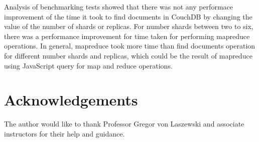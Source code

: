 Analysis of benchmarking tests showed that there was not any performace
improvement of the time it took to find documents in CouchDB  by
changing the value of the number of shards or replicas. For number
shards between two to six, there was a performance improvement for
time taken for performing mapreduce operations. In general, mapreduce
took more time than find documents operation for different number
shards and replicas, which could be the result of mapreduce using
JavaScript query for map and reduce operations.


\section*{Acknowledgements}

The author would like to thank Professor Gregor von Laszewski and
associate instructors for their help and guidance.


 





